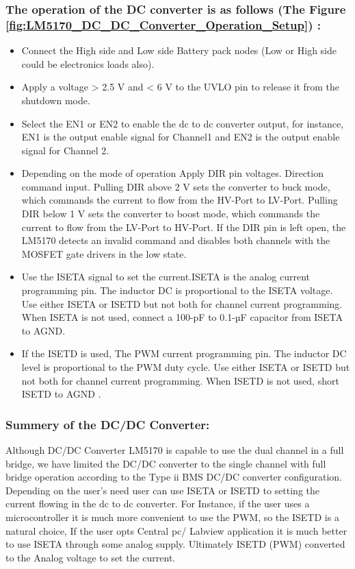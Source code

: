 \subsubsection{The operation of the DC converter is as follows (The Figure \ref{fig:LM5170_DC_DC_Converter_Operation_Setup}) :}
\begin{itemize}
    \item Connect the High side and Low side Battery pack nodes (Low or High side could be electronics loads also).
    \item Apply a voltage > 2.5 V and < 6 V  to the UVLO pin to release it from the shutdown mode.
    \item Select the EN1 or EN2 to enable the dc to dc converter output, for instance, EN1 is the output enable signal for Channel1 and EN2 is the output enable signal for Channel 2.
    \item Depending on the mode of operation Apply DIR pin voltages. Direction command input. Pulling DIR above 2 V sets the converter to buck mode, which commands the current to flow from the HV-Port to LV-Port. Pulling DIR below 1 V sets the converter to boost mode, which commands the current to flow from the LV-Port to HV-Port. If the DIR pin is left open, the LM5170 detects an invalid command and disables both channels with the MOSFET gate drivers in the low state\cite[p .5]{TI_LM5170_EVM_User_Guide}. 
    \item Use the ISETA signal to set the current.ISETA is the analog current programming pin. The inductor DC is proportional to the ISETA voltage. Use either ISETA or ISETD but not both for channel current programming. When ISETA is not used, connect a 100-pF to 0.1-µF capacitor from ISETA to AGND\cite[p .5]{TI_LM5170_EVM_User_Guide}.
    \item If the ISETD is used, The PWM current programming pin. The inductor DC level is proportional to the PWM duty cycle. Use either ISETA or ISETD but not both for channel current programming. When ISETD is not used, short ISETD to AGND \cite[p .6]{TI_LM5170_EVM_User_Guide}.
\end{itemize}
\subsubsection{Summery of the DC/DC Converter:}
\indent Although DC/DC Converter LM5170 is capable to use the dual channel in a full bridge, we have limited the DC/DC converter to the single channel with full bridge operation according to the Type ii BMS DC/DC converter configuration. Depending on the user's need user can use ISETA or ISETD to setting the current flowing in the dc to dc converter. For Instance, if the user uses a microcontroller it is much more convenient to use the PWM, so the ISETD is a natural choice, If the user opts Central pc/ Labview application it is much better to use ISETA through some analog supply. Ultimately ISETD (PWM) converted to the Analog voltage to set the current.